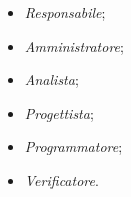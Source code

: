 	\begin{itemize}
		\item \textit{Responsabile};
		\item \textit{Amministratore};
		\item \textit{Analista};
		\item \textit{Progettista};
		\item \textit{Programmatore};
		\item \textit{Verificatore}.
	\end{itemize}
	\begin{comment}
		
	Ciascun ruolo ha un diverso costo. Di seguito verrà riportato, per ogni ruolo, il suo costo orario:

		\begin{tabularx}{\textwidth}{|c|c|}
			\hline
			\textbf{Ruolo} & \textbf{Costo} \\
			\hline
			Responsabile & 30 \euro \\
			Amministratore & 20 \euro \\
			Analista & 25 \euro \\
			Progettista & 22 \euro \\
			Programmatore & 15 \euro \\
			Verificatore & 15 \euro \\
			\hline
			\caption{Costi per ruolo}
		\end{tabularx}

	\end{comment}